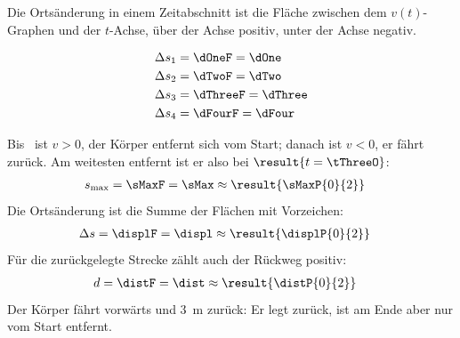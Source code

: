 Die Ortsänderung in einem Zeitabschnitt ist die Fläche zwischen dem $v(t)$-Graphen und der $t$-Achse, über der Achse positiv, unter der Achse negativ.
\begin{center}
\end{center}
\begin{align}
 \Delta s_1 &= \dOneF = \dOne \\
 \Delta s_2 &= \dTwoF = \dTwo \\
 \Delta s_3 &= \dThreeF = \dThree \\
 \Delta s_4 &= \dFourF = \dFour
\end{align}
\begin{abcliste}
\abc Bis \tThreeO\ ist $v>0$, der Körper entfernt sich vom Start; danach ist $v<0$, er fährt zurück. Am weitesten entfernt ist er also bei $\result{t = \tThreeO}$:
\begin{align}
 s_\mathrm{max} &= \sMaxF = \sMax \approx \result{\sMaxP{0}{2}}
\end{align}
\abc Die Ortsänderung ist die Summe der Flächen mit Vorzeichen:
\begin{align}
 \Delta s &= \displF = \displ \approx \result{\displP{0}{2}}
\end{align}
\abc Für die zurückgelegte Strecke zählt auch der Rückweg positiv:
\begin{align}
 d &= \distF = \dist \approx \result{\distP{0}{2}}
\end{align}
Der Körper fährt  vorwärts und \SI{3}{\meter} zurück: Er legt  zurück, ist am Ende aber nur  vom Start entfernt.
\end{abcliste}
